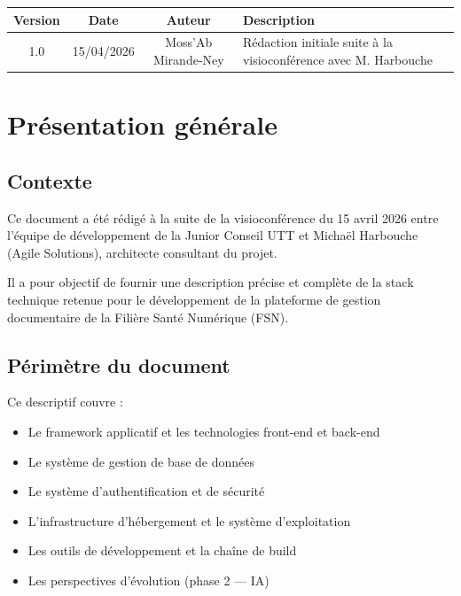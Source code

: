 \documentclass[a4paper,12pt,french]{article}
\begin{document}
\begin{tabularx}{\textwidth}{c c c X}
\toprule
\textbf{Version} & \textbf{Date} & \textbf{Auteur} & \textbf{Description} \\
\midrule
1.0 & 15/04/2026 & Moss'Ab Mirande-Ney & Rédaction initiale suite à la visioconférence avec M. Harbouche \\
\bottomrule
\end{tabularx}

\newpage
\tableofcontents
\newpage


\section{Présentation générale}

\subsection{Contexte}

Ce document a été rédigé à la suite de la visioconférence du 15 avril 2026 entre l'équipe de développement de la Junior Conseil UTT et Michaël Harbouche (Agile Solutions), architecte consultant du projet.

Il a pour objectif de fournir une description précise et complète de la stack technique retenue pour le développement de la plateforme de gestion documentaire de la Filière Santé Numérique (FSN).

\subsection{Périmètre du document}

Ce descriptif couvre :

\begin{itemize}
  \item Le framework applicatif et les technologies front-end et back-end
  \item Le système de gestion de base de données
  \item Le système d'authentification et de sécurité
  \item L'infrastructure d'hébergement et le système d'exploitation
  \item Les outils de développement et la chaîne de build
  \item Les perspectives d'évolution (phase 2 — IA)
\end{itemize}
\end{document}
